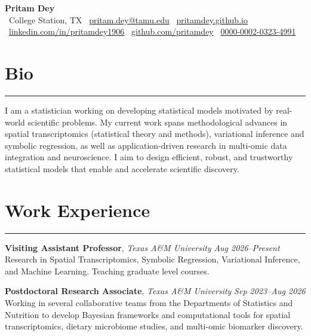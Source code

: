 \documentclass[11pt]{article}
\newcommand{\SectionRule}{\vspace{-0.3em}\noindent\rule{\linewidth}{1.2pt}\vspace{0.6em}}
\begin{document}
\begin{center}
  {\Huge \bfseries Pritam Dey}\\[0.2in]
  \faMapMarker*\, College Station, TX \quad\textbar\quad
  \faEnvelope\, \href{mailto:pritam.dey@tamu.edu}{pritam.dey@tamu.edu} \quad\textbar\quad
  \faGlobe\, \href{https://pritamdey.github.io}{pritamdey.github.io}
  \\
  \faLinkedin\, \href{https://linkedin.com/in/pritamdey1906}{linkedin.com/in/pritamdey1906} \quad\textbar\quad
  \faGithub\, \href{https://github.com/pritamdey}{github.com/pritamdey} \quad\textbar\quad
  \faOrcid\, \href{https://orcid.org/0000-0002-0323-4991}{0000-0002-0323-4991}
\end{center}

\section*{Bio}
\SectionRule

I am a statistician working on developing statistical models motivated by real-world scientific problems. My current work spans methodological advances in spatial transcriptomics (statistical theory and methods), variational inference and symbolic regression, as well as application-driven research in multi-omic data integration and neuroscience. I aim to design efficient, robust, and trustworthy statistical models that enable and accelerate scientific discovery.    


\section*{Work Experience}
\SectionRule

\textbf{Visiting Assistant Professor}, \textit{Texas A\&M University } \hfill \textit{Aug 2026--Present}\\
Research in Spatial Transcriptomics, Symbolic Regression, Variational Inference, and Machine Learning. Teaching graduate level courses.
\vspace{0.2cm}

\textbf{Postdoctoral Research Associate}, \textit{Texas A\&M University } \hfill \textit{Sep 2023--Aug 2026}\\
  Working in several collaborative teams from the Departments of Statistics and Nutrition to develop Bayesian frameworks and computational tools for spatial transcriptomics, dietary microbiome studies, and multi-omic biomarker discovery.
\vspace{0.2cm}
\end{document}
